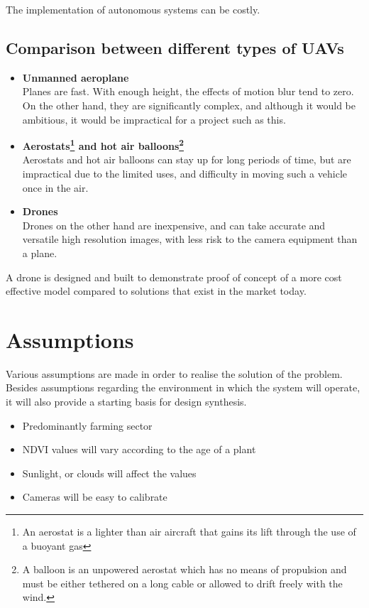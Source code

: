 \noindent
The implementation of autonomous systems can be costly. 

\subsection{Comparison between different types of UAVs}

\begin{itemize}
    \item \textbf{Unmanned aeroplane}\\
    Planes are fast. With enough height, the effects of motion blur tend to zero. On the other hand, they are significantly complex, and although it would be ambitious, it would be impractical for a project such as this.
    \item \textbf{Aerostats\footnote{An aerostat is a lighter than air aircraft that gains its lift through the use of a buoyant gas} and hot air balloons\footnote{A balloon is an unpowered aerostat which has no means of propulsion and must be either tethered on a long cable or allowed to drift freely with the wind.}}\\
    Aerostats and hot air balloons can stay up for long periods of time, but are impractical due to the limited uses, and difficulty in moving such a vehicle once in the air.
    \item \textbf{Drones}\\
    Drones on the other hand are inexpensive, and can take accurate and versatile high resolution images, with less risk to the camera equipment than a plane.\\
    
\end{itemize}

\noindent
A drone is designed and built to demonstrate proof of concept of a more cost effective model compared to solutions that exist in the market today.\\

\section{Assumptions}

Various assumptions are made in order to realise the solution of the problem. Besides assumptions regarding the environment in which the system will operate, it will also provide a starting basis for design synthesis.

\begin{itemize}
    \item Predominantly farming sector
    \item NDVI values will vary according to the age of a plant
    \item Sunlight, or clouds will affect the values
    \item Cameras will be easy to calibrate
\end{itemize}

